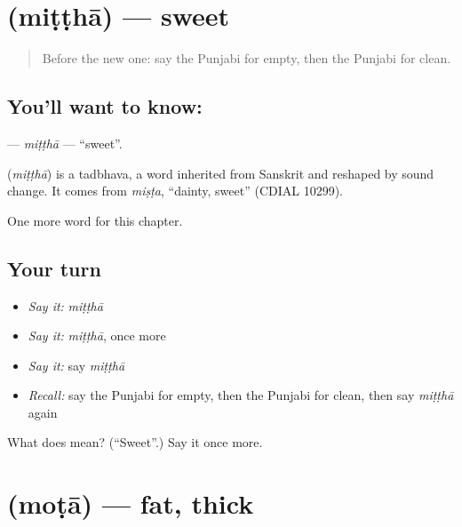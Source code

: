 \section[\texorpdfstring{\pa{ਮਿੱਠਾ} (miṭṭhā)}{ਮਿੱਠਾ (miṭṭhā)}]{ (miṭṭhā) — sweet}

\label{lesson:PA-C82-mittha}



\begin{quote}
Before the new one: say the Punjabi for empty, then the Punjabi for clean.
\end{quote}

\subsection*{You'll want to know: }
\textbf{} — \emph{miṭṭhā} — \textquotedblleft{}sweet\textquotedblright{}.

\begin{cousinweb}
\textbf{} (\emph{miṭṭhā}) is a tadbhava, a word inherited from Sanskrit and reshaped by sound change. It comes from \emph{miṣṭa}, \textquotedblleft{}dainty, sweet\textquotedblright{} (CDIAL 10299).
\end{cousinweb}

\begin{grammarlens}[title={What you've built}]
One more word for this chapter.
\end{grammarlens}

\subsection*{Your turn}
\begin{itemize}
\raggedright
  \item \emph{Say it:} \emph{miṭṭhā}
  \item \emph{Say it:} \emph{miṭṭhā}, once more
  \item \emph{Say it:} say \emph{miṭṭhā}
  \item \emph{Recall:} say the Punjabi for empty, then the Punjabi for clean, then say \emph{miṭṭhā} again
\end{itemize}

\begin{tcolorbox}[breakable,colback=teal!4,colframe=teal!35!black,title={Before you move on}]
What does  mean? (\textquotedblleft{}Sweet\textquotedblright{}.) Say it once more.
\end{tcolorbox}
\section[\texorpdfstring{\pa{ਮੋਟਾ} (moṭā)}{ਮੋਟਾ (moṭā)}]{ (moṭā) — fat, thick}

